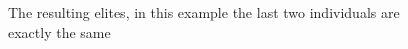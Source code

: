 \documentclass[tikz, runningheads]{llncs}
\begin{document}
\begin{figure}[htbp]
	\centering
	\begin{adjustbox}{valign=t}
		\scalebox{0.75}{
		\begin{forest}
			[+
				[*
					[/
						[+
							[-
								[$x_3$]
								[$x_1$]
							]
							[*
								[$x_5$]
								[$-4.1$]
							]
						]
						[$x_2$]
					]
					[+
						[-
							[$x_5$]
							[$x_{11}$]
						]
						[$x_8$]
					]
				]	
				[/
					[$x_3$]
					[-
						[$x_4$]
						[$x_{12}$]
					]
				]
			]
		\end{forest}
		}
	\end{adjustbox}\qquad
	\begin{adjustbox}{valign=t}
		\scalebox{0.57}{
		\begin{forest}
			[+
				[*
					[/
						[+
							[-
								[$x_3$]
								[$x_1$]
							]
							[*
								[$x_5$]
								[$-4.1$]
							]
						]
						[$x_2$]
					]
					[+
						[-
							[$x_5$]
							[$x_{11}$]
						]
						[$x_8$]
					]
				]	
				[/
					[$x_3$]
					[-
						[$x_4$]
						[$x_{12}$]
					]
				]
			]
		\end{forest}
		}
	\end{adjustbox}
	\caption{The resulting elites, in this example the last two individuals are exactly the same} \label{theElite}
\end{figure}
\end{document}
